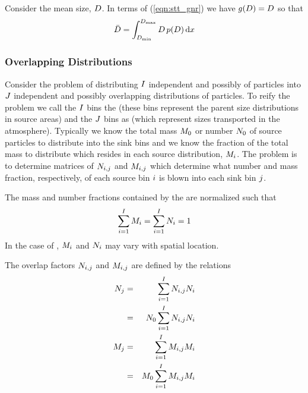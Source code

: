 \documentclass[12pt,twoside]{article}
\begin{document}
Consider the mean size, $D$.
In terms of (\ref{eqn:stt_gnr}) we have $g(D) = D$ so that
\begin{equation}
\bar{D} = \int_{D_{\mathrm{min}}}^{D_{\mathrm{max}}}  D \, p(D) \,\mathrm{d}x
\end{equation}

\subsubsection[Overlapping Distributions]{Overlapping Distributions}
Consider the problem of distributing $I$ independent and possibly
 of particles into $J$ independent and
possibly overlapping distributions of particles.
To reify the problem we call the $I$ bins the  (these bins represent the parent size distributions in
 source areas) and the $J$ bins as 
 (which represent sizes transported in the
atmosphere). 
Typically we know the total mass $M_{0}$ or number $N_{0}$ of 
source particles to distribute into the sink bins and we know the
fraction of the total mass to distribute which resides in each source
distribution, $M_{i}$. 
The problem is to determine matrices of 
$N_{i,j}$ and $M_{i,j}$ which determine what number and
mass fraction, respectively, of each source bin $i$ is blown
into each sink bin $j$. 

The mass and number fractions contained by the  are normalized such that
\begin{equation}
\sum_{i = 1}^{I} M_{i} = \sum_{i = 1}^{I} N_{i} = 1
\label{eqn:frc_nrm}
\end{equation}
In the case of , $M_{i}$ and $N_{i}$
may vary with spatial location.

The overlap factors $N_{i,j}$ and $M_{i,j}$ are defined by the
relations 
\begin{eqnarray}
\label{eqn:ovr_nbr_dfn}
N_{j} & = & \sum_{i = 1}^{I} N_{i,j} N_{i} \nonumber \\
& = & N_{0} \sum_{i = 1}^{I} N_{i,j} N_{i} \\
\label{eqn:ovr_mss_dfn}
M_{j} & = & \sum_{i = 1}^{I} M_{i,j} M_{i} \nonumber \\
& = & M_{0} \sum_{i = 1}^{I} M_{i,j} M_{i}
\end{eqnarray}
\end{document}
